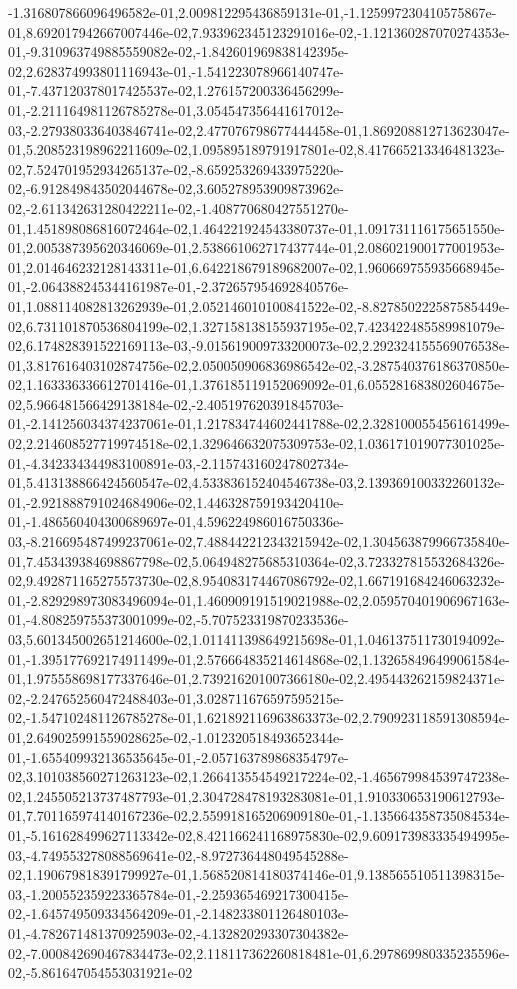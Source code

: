 -1.316807866096496582e-01,2.009812295436859131e-01,-1.125997230410575867e-01,8.692017942667007446e-02,7.933962345123291016e-02,-1.121360287070274353e-01,-9.310963749885559082e-02,-1.842601969838142395e-02,2.628374993801116943e-01,-1.541223078966140747e-01,-7.437120378017425537e-02,1.276157200336456299e-01,-2.211164981126785278e-01,3.054547356441617012e-03,-2.279380336403846741e-02,2.477076798677444458e-01,1.869208812713623047e-01,5.208523198962211609e-02,1.095895189791917801e-02,8.417665213346481323e-02,7.524701952934265137e-02,-8.659253269433975220e-02,-6.912849843502044678e-02,3.605278953909873962e-02,-2.611342631280422211e-02,-1.408770680427551270e-01,1.451898086816072464e-02,1.464221924543380737e-01,1.091731116175651550e-01,2.005387395620346069e-01,2.538661062717437744e-01,2.086021900177001953e-01,2.014646232128143311e-01,6.642218679189682007e-02,1.960669755935668945e-01,-2.064388245344161987e-01,-2.372657954692840576e-01,1.088114082813262939e-01,2.052146010100841522e-02,-8.827850222587585449e-02,6.731101870536804199e-02,1.327158138155937195e-02,7.423422485589981079e-02,6.174828391522169113e-03,-9.015619009733200073e-02,2.292324155569076538e-01,3.817616403102874756e-02,2.050050906836986542e-02,-3.287540376186370850e-02,1.163336336612701416e-01,1.376185119152069092e-01,6.055281683802604675e-02,5.966481566429138184e-02,-2.405197620391845703e-01,-2.141256034374237061e-01,1.217834744602441788e-02,2.328100055456161499e-02,2.214608527719974518e-02,1.329646632075309753e-02,1.036171019077301025e-01,-4.342334344983100891e-03,-2.115743160247802734e-01,5.413138866424560547e-02,4.533836152404546738e-03,2.139369100332260132e-01,-2.921888791024684906e-02,1.446328759193420410e-01,-1.486560404300689697e-01,4.596224986016750336e-03,-8.216695487499237061e-02,7.488442212343215942e-02,1.304563879966735840e-01,7.453439384698867798e-02,5.064948275685310364e-02,3.723327815532684326e-02,9.492871165275573730e-02,8.954083174467086792e-02,1.667191684246063232e-01,-2.829298973083496094e-01,1.460909191519021988e-02,2.059570401906967163e-01,-4.808259755373001099e-02,-5.707523319870233536e-03,5.601345002651214600e-02,1.011411398649215698e-01,1.046137511730194092e-01,-1.395177692174911499e-01,2.576664835214614868e-02,1.132658496499061584e-01,1.975558698177337646e-01,2.739216201007366180e-02,2.495443262159824371e-02,-2.247652560472488403e-01,3.028711676597595215e-02,-1.547102481126785278e-01,1.621892116963863373e-02,2.790923118591308594e-01,2.649025991559028625e-02,-1.012320518493652344e-01,-1.655409932136535645e-01,-2.057163789868354797e-02,3.101038560271263123e-02,1.266413554549217224e-02,-1.465679984539747238e-02,1.245505213737487793e-01,2.304728478193283081e-01,1.910330653190612793e-01,7.701165974140167236e-02,2.559918165206909180e-01,-1.135664358735084534e-01,-5.161628499627113342e-02,8.421166241168975830e-02,9.609173983335494995e-03,-4.749553278088569641e-02,-8.972736448049545288e-02,1.190679818391799927e-01,1.568520814180374146e-01,9.138565510511398315e-03,-1.200552359223365784e-01,-2.259365469217300415e-02,-1.645749509334564209e-01,-2.148233801126480103e-01,-4.782671481370925903e-02,-4.132820293307304382e-02,-7.000842690467834473e-02,2.118117362260818481e-01,6.297869980335235596e-02,-5.861647054553031921e-02
